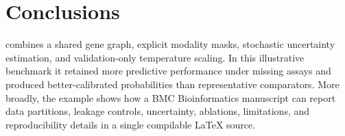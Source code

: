 \section{Conclusions}

\modelname{} combines a shared gene graph, explicit modality masks, stochastic
uncertainty estimation, and validation-only temperature scaling. In this
illustrative benchmark it retained more predictive performance under missing
assays and produced better-calibrated probabilities than representative
comparators. More broadly, the example shows how a BMC Bioinformatics manuscript
can report data partitions, leakage controls, uncertainty, ablations, limitations,
and reproducibility details in a single compilable LaTeX source.

